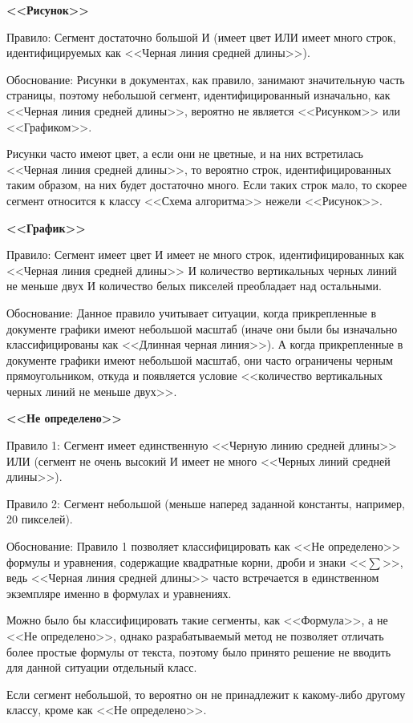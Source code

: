\textbf{<<Рисунок>>}

Правило: Сегмент достаточно большой И (имеет цвет ИЛИ имеет много строк, идентифицируемых как <<Черная линия средней длины>>).

Обоснование: Рисунки в документах, как правило, занимают значительную часть страницы, поэтому небольшой сегмент, идентифицированный изначально, как <<Черная линия средней длины>>, вероятно не является <<Рисунком>> или <<Графиком>>.

Рисунки часто имеют цвет, а если они не цветные, и на них встретилась <<Черная линия средней длины>>, то вероятно строк, идентифицированных таким образом, на них будет достаточно много.
Если таких строк мало, то скорее сегмент относится к классу <<Схема алгоритма>> нежели <<Рисунок>>.

\textbf{<<График>>}

Правило: Сегмент имеет цвет И имеет не много строк, идентифицированных как <<Черная линия средней длины>> И количество вертикальных черных линий не меньше двух И количество белых пикселей преобладает над остальными.

Обоснование: Данное правило учитывает ситуации, когда прикрепленные в документе графики имеют небольшой масштаб (иначе они были бы изначально классифицированы как <<Длинная черная линия>>).
А когда прикрепленные в документе графики имеют небольшой масштаб, они часто ограничены черным прямоугольником, откуда и появляется условие <<количество вертикальных черных линий не меньше двух>>.

\textbf{<<Не определено>>}

Правило 1: Сегмент имеет единственную <<Черную линию средней длины>> ИЛИ (сегмент не очень высокий И имеет не много <<Черных линий средней длины>>).

Правило 2: Сегмент небольшой (меньше наперед заданной константы, например, 20 пикселей).

Обоснование: Правило 1 позволяет классифицировать как <<Не определено>> формулы и уравнения, содержащие квадратные корни, дроби и знаки <<$\sum$>>, ведь <<Черная линия средней длины>> часто встречается в единственном экземпляре именно в формулах и уравнениях.

Можно было бы классифицировать такие сегменты, как <<Формула>>, а не <<Не определено>>, однако разрабатываемый метод не позволяет отличать более простые формулы от текста, поэтому было принято решение не вводить для данной ситуации отдельный класс.

Если сегмент небольшой, то вероятно он не принадлежит к какому-либо другому классу, кроме как <<Не определено>>.

